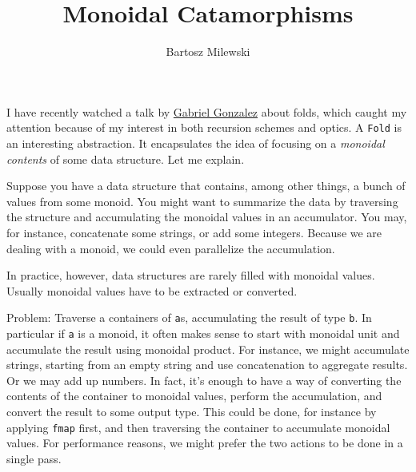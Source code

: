 \documentclass[11pt]{amsart}
\author{Bartosz Milewski}
\title{Monoidal Catamorphisms}
\newcommand{\hask}[1]{\texttt{#1}}
\begin{document}
\maketitle{}

I have recently watched a talk by \href{https://github.com/Gabriel439/slides/blob/master/munihac/foldmap.md}{Gabriel Gonzalez} about folds, which caught my attention because of my interest in both recursion schemes and optics. A \hask{Fold} is an interesting abstraction. It encapsulates the idea of focusing on a \emph{monoidal contents} of some data structure. Let me explain.

Suppose you have a data structure that contains, among other things, a bunch of values from some monoid. You might want to summarize the data by traversing the structure and accumulating the monoidal values in an accumulator. You may, for instance, concatenate some strings, or add some integers. Because we are dealing with a monoid, we could even parallelize the accumulation. 

In practice, however, data structures are rarely filled with monoidal values. Usually monoidal values have to be extracted or converted. 

Problem: Traverse a containers of \hask{a}s, accumulating the result of type \hask{b}. In particular if \hask{a} is a monoid, it often makes sense to start with monoidal unit and accumulate the result using monoidal product. For instance, we might accumulate strings, starting from an empty string and use concatenation to aggregate results. Or we may add up numbers. In fact, it's enough to have a way of converting the contents of the container to monoidal values, perform the accumulation, and convert the result to some output type. This could be done, for instance by applying \hask{fmap} first, and then traversing the container to accumulate monoidal values. For performance reasons, we might prefer the two actions to be done in a single pass. 
\end{document}
